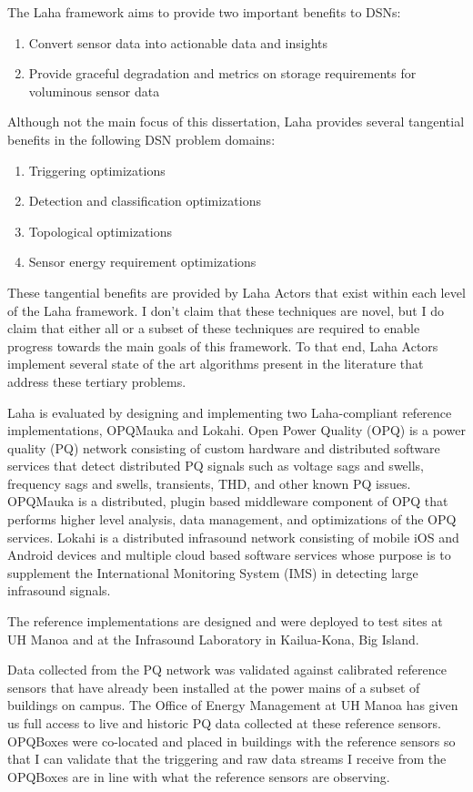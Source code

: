 The Laha framework aims to provide two important benefits to DSNs:
\begin{enumerate}
	\item Convert sensor data into actionable data and insights
	\item Provide graceful degradation and metrics on storage requirements for voluminous sensor data
\end{enumerate}

Although not the main focus of this dissertation, Laha provides several tangential benefits in the following DSN problem domains:

\begin{enumerate}
	\item Triggering optimizations
	\item Detection and classification optimizations
	\item Topological optimizations
	\item Sensor energy requirement optimizations
\end{enumerate}

These tangential benefits are provided by Laha Actors that exist within each level of the Laha framework. I don't claim that these techniques are novel, but I do claim that either all or a subset of these techniques are required to enable progress towards the main goals of this framework. To that end, Laha Actors implement several state of the art algorithms present in the literature that address these tertiary problems.

Laha is evaluated by designing and implementing two Laha-compliant reference implementations, OPQMauka and Lokahi. Open Power Quality (OPQ) is a power quality (PQ) network consisting of custom hardware and distributed software services that detect distributed PQ signals such as voltage sags and swells, frequency sags and swells, transients, THD, and other known PQ issues. OPQMauka is a distributed, plugin based middleware component of OPQ that performs higher level analysis, data management, and optimizations of the OPQ services. Lokahi is a distributed infrasound network consisting of mobile iOS and Android devices and multiple cloud based software services whose purpose is to supplement the International Monitoring System (IMS) in detecting large infrasound signals.

The reference implementations are designed and were deployed to test sites at UH Manoa and at the Infrasound Laboratory in Kailua-Kona, Big Island.

Data collected from the PQ network was validated against calibrated reference sensors that have already been installed at the power mains of a subset of buildings on campus. The Office of Energy Management at UH Manoa has given us full access to live and historic PQ data collected at these reference sensors. OPQBoxes were co-located and placed in buildings with the reference sensors so that I can validate that the triggering and raw data streams I receive from the OPQBoxes are in line with what the reference sensors are observing.

